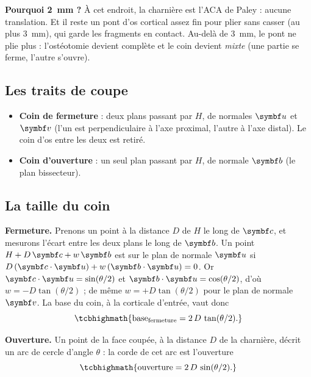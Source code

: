 \begin{pourquoi}
\textbf{Pourquoi 2~mm ?} À cet endroit, la charnière est l'ACA de Paley : aucune translation. Et il reste un pont d'os
cortical assez fin pour plier sans casser (au plus 3~mm), qui garde les fragments en contact. Au-delà de 3~mm, le pont
ne plie plus : l'ostéotomie devient complète et le coin devient \emph{mixte} (une partie se ferme, l'autre s'ouvre).
\end{pourquoi}

\subsection{Les traits de coupe}

\begin{itemize}
  \item \textbf{Coin de fermeture} : deux plans passant par $H$, de normales $\vb{u}$ et $\vb{v}$ (l'un est
  perpendiculaire à l'axe proximal, l'autre à l'axe distal). Le coin d'os entre les deux est retiré.
  \item \textbf{Coin d'ouverture} : un seul plan passant par $H$, de normale $\vb{b}$ (le plan bissecteur).
\end{itemize}


\subsection{La taille du coin}

\textbf{Fermeture.} Prenons un point à la distance $D$ de $H$ le long de $\vb{c}$, et mesurons l'écart entre les deux
plans le long de $\vb{b}$. Un point $H + D\,\vb{c} + w\,\vb{b}$ est sur le plan de normale $\vb{u}$ si
$D\,(\vb{c}\cdot\vb{u}) + w\,(\vb{b}\cdot\vb{u}) = 0$. Or $\vb{c}\cdot\vb{u} = \sin(\theta/2)$ et
$\vb{b}\cdot\vb{u} = \cos(\theta/2)$, d'où $w = -D\tan(\theta/2)$ ; de même $w = +D\tan(\theta/2)$ pour le plan de
normale $\vb{v}$. La base du coin, à la corticale d'entrée, vaut donc
\begin{equation}
  \tcbhighmath{\text{base}_{\text{fermeture}} = 2\,D\,\tan(\theta/2).}
\end{equation}

\textbf{Ouverture.} Un point de la face coupée, à la distance $D$ de la charnière, décrit un arc de cercle d'angle
$\theta$ : la corde de cet arc est l'ouverture
\begin{equation}
  \tcbhighmath{\text{ouverture} = 2\,D\,\sin(\theta/2).}
\end{equation}

